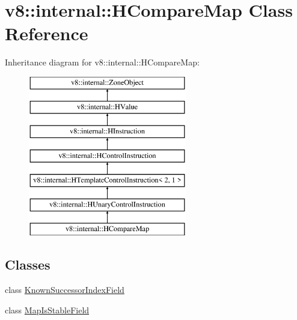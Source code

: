 \hypertarget{classv8_1_1internal_1_1_h_compare_map}{}\section{v8\+:\+:internal\+:\+:H\+Compare\+Map Class Reference}
\label{classv8_1_1internal_1_1_h_compare_map}
Inheritance diagram for v8\+:\+:internal\+:\+:H\+Compare\+Map\+:\begin{figure}[H]
\begin{center}
\leavevmode
\includegraphics[height=7.000000cm]{classv8_1_1internal_1_1_h_compare_map}
\end{center}
\end{figure}
\subsection*{Classes}
\begin{DoxyCompactItemize}
\item 
class \hyperlink{classv8_1_1internal_1_1_h_compare_map_1_1_known_successor_index_field}{Known\+Successor\+Index\+Field}
\item 
class \hyperlink{classv8_1_1internal_1_1_h_compare_map_1_1_map_is_stable_field}{Map\+Is\+Stable\+Field}
\end{DoxyCompactItemize}
